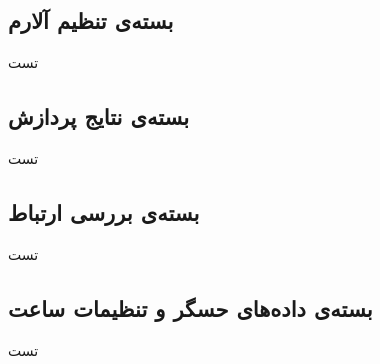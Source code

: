 \subsection{بسته‌ی تنظیم آلارم}
تست

\subsection{بسته‌ی نتایج پردازش}
تست

\subsection{بسته‌ی بررسی ارتباط}
تست

\subsection{بسته‌ی داده‌های حسگر  و تنظیمات ساعت}
تست






